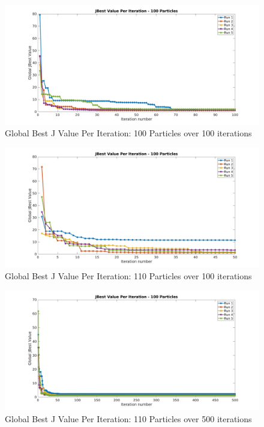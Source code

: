 \begin{figure}[H]
\includegraphics[width=\linewidth]{./jpgs/globalBestPerIteration100.jpg}
\caption{Global Best J Value Per Iteration: 100 Particles over 100 iterations}
\end{figure}


\begin{figure}[H]
    \includegraphics[width=\linewidth]{./jpgs/globalBestPerIteration50.jpg}
    \caption{Global Best J Value Per Iteration: 110 Particles over 100 iterations}
    \end{figure}


\begin{figure}[H]
    \includegraphics[width=\linewidth]{./jpgs/globalBestPerIteration500.jpg}
    \caption{Global Best J Value Per Iteration: 110 Particles over 500 iterations}
    \end{figure}
